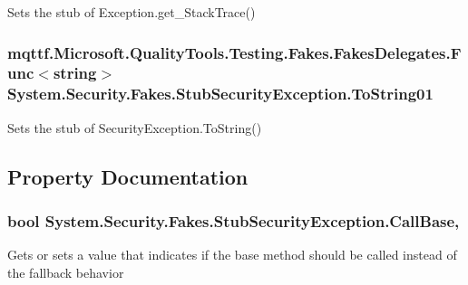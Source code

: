 Sets the stub of Exception.\-get\-\_\-\-Stack\-Trace()

\hypertarget{class_system_1_1_security_1_1_fakes_1_1_stub_security_exception_a0b24eb9a81d470f82893d781ef800ebe}{
\subsubsection[{To\-String01}]{\setlength{\rightskip}{0pt plus 5cm}mqttf.\-Microsoft.\-Quality\-Tools.\-Testing.\-Fakes.\-Fakes\-Delegates.\-Func$<$string$>$ System.\-Security.\-Fakes.\-Stub\-Security\-Exception.\-To\-String01}}\label{class_system_1_1_security_1_1_fakes_1_1_stub_security_exception_a0b24eb9a81d470f82893d781ef800ebe}


Sets the stub of Security\-Exception.\-To\-String()



\subsection{Property Documentation}
\hypertarget{class_system_1_1_security_1_1_fakes_1_1_stub_security_exception_aa16a8a69a844906d88788b738e0691ec}{
\subsubsection[{Call\-Base}]{\setlength{\rightskip}{0pt plus 5cm}bool System.\-Security.\-Fakes.\-Stub\-Security\-Exception.\-Call\-Base\hspace{0.3cm}{\ttfamily [get]}, {\ttfamily [set]}}}\label{class_system_1_1_security_1_1_fakes_1_1_stub_security_exception_aa16a8a69a844906d88788b738e0691ec}


Gets or sets a value that indicates if the base method should be called instead of the fallback behavior

